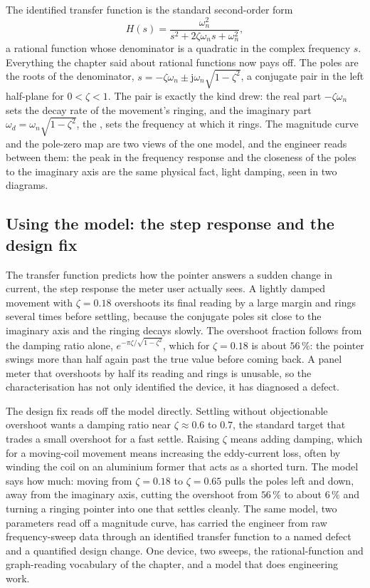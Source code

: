 The identified transfer function is the standard second-order form
\[
  H(s) = \frac{\omega_{n}^{2}}{s^{2} + 2\zeta\omega_{n} s
    + \omega_{n}^{2}},
\]
a rational function whose denominator is a quadratic in the complex
frequency $s$. Everything the chapter said about rational functions
now pays off. The poles are the roots of the denominator,
$s = -\zeta\omega_{n} \pm \mathrm{j}\omega_{n}\sqrt{1 - \zeta^{2}}$, a
conjugate pair in the left half-plane for $0 < \zeta < 1$. The pair is
exactly the kind  drew: the real
part $-\zeta\omega_{n}$ sets the decay rate of the movement's ringing,
and the imaginary part $\omega_{d} = \omega_{n}\sqrt{1 - \zeta^{2}}$,
the , sets the frequency at which it
rings. The magnitude curve and the pole-zero map are two views of the
one model, and the engineer reads between them: the peak in the
frequency response and the closeness of the poles to the imaginary
axis are the same physical fact, light damping, seen in two diagrams.

\subsection{Using the model: the step response and the design fix}

The transfer function predicts how the pointer answers a sudden change
in current, the step response the meter user actually sees. A lightly
damped movement with $\zeta = 0.18$ overshoots its final reading by a
large margin and rings several times before settling, because the
conjugate poles sit close to the imaginary axis and the ringing decays
slowly. The overshoot fraction follows from the damping ratio alone,
$e^{-\pi\zeta/\sqrt{1 - \zeta^{2}}}$, which for $\zeta = 0.18$ is about
$56\,\%$: the pointer swings more than half again past the true value
before coming back. A panel meter that overshoots by half its reading
and rings is unusable, so the characterisation has not only identified
the device, it has diagnosed a defect.

The design fix reads off the model directly. Settling without
objectionable overshoot wants a damping ratio near
$\zeta \approx 0.6$ to $0.7$, the standard target that trades a small
overshoot for a fast settle. Raising $\zeta$ means adding damping,
which for a moving-coil movement means increasing the eddy-current
loss, often by winding the coil on an aluminium former that acts as a
shorted turn. The model says how much: moving from $\zeta = 0.18$ to
$\zeta = 0.65$ pulls the poles left and down, away from the imaginary
axis, cutting the overshoot from $56\,\%$ to about $6\,\%$ and turning
a ringing pointer into one that settles cleanly. The same model, two
parameters read off a magnitude curve, has carried the engineer from
raw frequency-sweep data through an identified transfer function to a
named defect and a quantified design change. One device, two sweeps,
the rational-function and graph-reading vocabulary of the chapter, and
a model that does engineering work.

